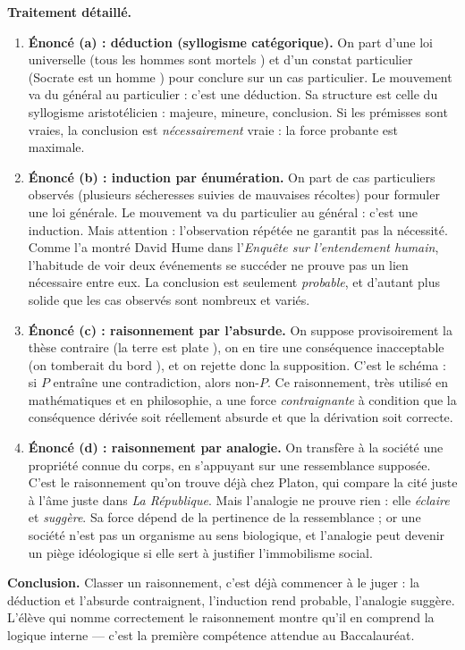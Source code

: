 \documentclass[11pt]{article}
\newcommand{\cle}[1]{{\popxbold\color{popdark}#1}}
\begin{document}
\begin{exoresolu}
\textbf{Traitement détaillé.}
\begin{enumerate}
\item \textbf{Énoncé (a) : déduction (syllogisme catégorique).} On part d'une loi universelle (\guillemotleft tous les hommes sont mortels \guillemotright) et d'un constat particulier (\guillemotleft Socrate est un homme \guillemotright) pour conclure sur un cas particulier. Le mouvement va du général au particulier : c'est une \cle{déduction}. Sa structure est celle du syllogisme aristotélicien : majeure, mineure, conclusion. Si les prémisses sont vraies, la conclusion est \emph{nécessairement} vraie : la force probante est maximale.
\item \textbf{Énoncé (b) : induction par énumération.} On part de cas particuliers observés (plusieurs sécheresses suivies de mauvaises récoltes) pour formuler une loi générale. Le mouvement va du particulier au général : c'est une \cle{induction}. Mais attention : l'observation répétée ne garantit pas la nécessité. Comme l'a montré David Hume dans l'\emph{Enquête sur l'entendement humain}, l'habitude de voir deux événements se succéder ne prouve pas un lien nécessaire entre eux. La conclusion est seulement \emph{probable}, et d'autant plus solide que les cas observés sont nombreux et variés.
\item \textbf{Énoncé (c) : raisonnement par l'absurde.} On suppose provisoirement la thèse contraire (\guillemotleft la terre est plate \guillemotright), on en tire une conséquence inacceptable (\guillemotleft on tomberait du bord \guillemotright), et on rejette donc la supposition. C'est le schéma : si $P$ entraîne une contradiction, alors non-$P$. Ce raisonnement, très utilisé en mathématiques et en philosophie, a une force \emph{contraignante} à condition que la conséquence dérivée soit réellement absurde et que la dérivation soit correcte.
\item \textbf{Énoncé (d) : raisonnement par analogie.} On transfère à la société une propriété connue du corps, en s'appuyant sur une ressemblance supposée. C'est le raisonnement qu'on trouve déjà chez Platon, qui compare la cité juste à l'âme juste dans \emph{La République}. Mais l'analogie ne prouve rien : elle \emph{éclaire} et \emph{suggère}. Sa force dépend de la pertinence de la ressemblance ; or une société n'est pas un organisme au sens biologique, et l'analogie peut devenir un piège idéologique si elle sert à justifier l'immobilisme social.
\end{enumerate}

\textbf{Conclusion.} Classer un raisonnement, c'est déjà commencer à le juger : la déduction et l'absurde contraignent, l'induction rend probable, l'analogie suggère. L'élève qui nomme correctement le raisonnement montre qu'il en comprend la logique interne — c'est la première compétence attendue au Baccalauréat.
\end{exoresolu}
\end{document}
